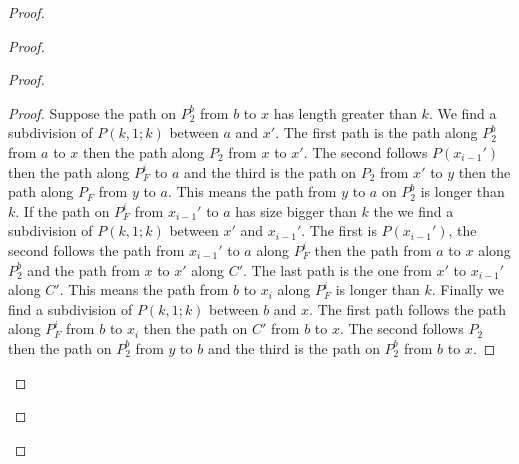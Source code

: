 \documentclass[utf8,10pt]{article}
\theoremstyle{plain}
\theoremstyle{definition}
\theoremstyle{remark}
\begin{document}
\begin{proof}
\begin{proof}
\begin{proof}
\begin{proof}
Suppose the path on $P_2^b$ from $b$ to $x$ has length greater than $k$. We find a subdivision of $P(k,1;k)$ between $a$ and $x'$.
The first path is the path along $P_2^b$ from $a$ to $x$ then the path along $P_2$ from $x$ to $x'$. The second follows $P(x_{i-1}')$
then the path along $P_F^i$ to $a$ and the third is the path on $P_2$ from $x'$ to $y$ then the path along $P_F$ from $y$ to $a$.
This means the path from $y$ to
$a$ on $P_2^b$ is longer than $k$. If the path on $P_F^i$ from  $x_{i-1}'$ to $a$ has size bigger than $k$ the we find a subdivision
of $P(k,1;k)$ between $x'$ and $x_{i-1}'$. The first is $P(x_{i-1}')$, the second follows the path from $x_{i-1}'$ to $a$ along $P_F^i$ then
the path from $a$ to $x$ along $P_2^b$ and the path from $x$ to $x'$ along $C'$. The last path is the one from $x'$ to $x_{i-1}'$ along
$C'$. This means the path from $b$ to $x_i$ along $P_F^i$ is longer than $k$. Finally we find a subdivision of $P(k,1;k)$ between $b$
and $x$. The first path follows the path along $P_F^i$ from $b$ to $x_i$ then the path on $C'$ from $b$ to $x$. The second follows $P_2$ then
the path on $P_2^b$ from $y$ to $b$ and the third is the path on $P_2^b$ from $b$ to $x$.

\end{proof}




\end{proof}
\end{proof}
\end{proof}
\end{document}
